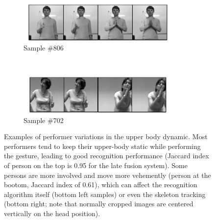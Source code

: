 
\begin{figure}[t]
        \centering
        \begin{subfigure}[c]{.5\textwidth}
        \centering
                \includegraphics[width=8cm,height=2cm, clip]{images/original806.png}
\vspace*{-2mm}
                \caption{\small{Sample \#806}}
        \end{subfigure}%
        \\
        \begin{subfigure}[c]{0.5\textwidth}
        \centering
                \includegraphics[width=8cm,height=2cm, clip]{images/original702.png}
\vspace*{-2mm}
                \caption{\small{Sample \#702}}
        \end{subfigure}
\vspace*{-3mm}
  \caption{
\small{Examples of performer variations in the  upper body dynamic.
 Most performers tend to keep their upper-body static while performing the gesture, 
leading to good recognition performance (Jaccard index of person on the top is 0.95 for the late fusion system).
%
Some persons are more involved  and move more vehemently (person at the bootom, Jaccard index 
of 0.61), which can affect the recognition algorithm itself (bottom left samples) or even the skeleton tracking 
(bottom right; note that normally cropped images are centered vertically on the head position).
}
}
\label{fig:bodydynamics}
\end{figure}



